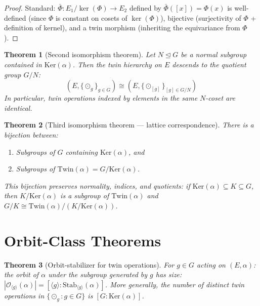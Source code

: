 \documentclass[12pt]{article}
\theoremstyle{plain}
\newtheorem{theorem}{Theorem}[section]
\theoremstyle{definition}
\theoremstyle{remark}
\newcommand{\Ker}{\mathrm{Ker}}
\newcommand{\Stab}{\mathrm{Stab}}
\newcommand{\Twin}{\mathrm{Twin}}
\begin{document}
\begin{proof}
Standard: $\bar\Phi: E_1/\ker(\Phi) \to E_2$ defined by $\bar\Phi([x]) = \Phi(x)$ is well-defined (since $\Phi$ is constant on cosets of $\ker(\Phi)$), bijective (surjectivity of $\Phi$ + definition of kernel), and a twin morphism (inheriting the equivariance from $\Phi$).
\end{proof}

\begin{theorem}[Second isomorphism theorem]\label{thm:iso2}
Let $N \trianglelefteq G$ be a normal subgroup contained in $\Ker(\alpha)$. Then the twin hierarchy on $E$ descends to the quotient group $G/N$:
\begin{equation}
(E, \{\odot_g\}_{g \in G}) \cong (E, \{\odot_{[g]}\}_{[g] \in G/N})
\end{equation}
In particular, twin operations indexed by elements in the same $N$-coset are identical.
\end{theorem}

\begin{theorem}[Third isomorphism theorem --- lattice correspondence]\label{thm:iso3}
There is a bijection between:
\begin{enumerate}[label=(\roman*)]
    \item Subgroups of $G$ containing $\Ker(\alpha)$, and
    \item Subgroups of $\Twin(\alpha) = G/\Ker(\alpha)$.
\end{enumerate}
This bijection preserves normality, indices, and quotients: if $\Ker(\alpha) \subseteq K \subseteq G$, then $K/\Ker(\alpha)$ is a subgroup of $\Twin(\alpha)$ and $G/K \cong \Twin(\alpha)/(K/\Ker(\alpha))$.
\end{theorem}


\section{Orbit-Class Theorems}
\label{sec:classes}

\begin{theorem}[Orbit-stabilizer for twin operations]\label{thm:orbit-stab}
For $g \in G$ acting on $(E, \alpha)$: the orbit of $\alpha$ under the subgroup generated by $g$ has size:
$|\mathcal{O}_{\langle g \rangle}(\alpha)| = [\langle g \rangle : \Stab_{\langle g \rangle}(\alpha)]$.
More generally, the number of distinct twin operations in $\{\odot_g : g \in G\}$ is $[G : \Ker(\alpha)]$.
\end{theorem}
\end{document}
